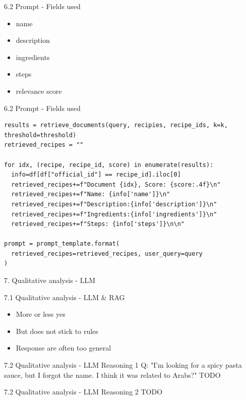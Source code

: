 \documentclass{beamer}
\begin{document}
\begin{frame}{6.2 Prompt - Fields used}
  \begin{itemize}
    \item name
    \item description
    \item ingredients
    \item steps
    \item relevance score
  \end{itemize}
\end{frame}

\begin{frame}[fragile]{6.2 Prompt - Fields used}
  \begin{verbatim}
results = retrieve_documents(query, recipies, recipe_ids, k=k, threshold=threshold)
retrieved_recipes = ""

for idx, (recipe, recipe_id, score) in enumerate(results):
  info=df[df["official_id"] == recipe_id].iloc[0]
  retrieved_recipes+=f"Document {idx}, Score: {score:.4f}\n"
  retrieved_recipes+=f"Name: {info['name']}\n"
  retrieved_recipes+=f"Description:{info['description']}\n"
  retrieved_recipes+=f"Ingredients:{info['ingredients']}\n"
  retrieved_recipes+=f"Steps: {info['steps']}\n\n"

prompt = prompt_template.format(
  retrieved_recipes=retrieved_recipes, user_query=query
)
  \end{verbatim}
\end{frame}

\begin{frame}{7. Qualitative analysis - LLM}
\end{frame}

\begin{frame}{7.1 Qualitative analysis - LLM \& RAG}
  \begin{itemize}
    \item More or less yes
    \item But does not stick to rules
    \item Response are often too general
  \end{itemize}
\end{frame}

\begin{frame}{7.2 Qualitative analysis - LLM Reasoning 1}
  Q: "I'm looking for a spicy pasta sauce, but I forgot the name. I think it was related to Arabs?"
  TODO
\end{frame}

\begin{frame}{7.2 Qualitative analysis - LLM Reasoning 2}
  TODO
\end{frame}
\end{document}
